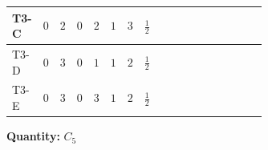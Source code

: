 \documentclass[8pt]{article}
\begin{document}
\begin{landscape}
\begin{longtable}{@{}llcccccc >{\raggedright\arraybackslash}p{0.21\linewidth} >{\raggedright\arraybackslash}p{0.21\linewidth} >{\raggedright\arraybackslash}p{0.21\linewidth}@{}}
\midrule
T3-C & $0$ & $2$ & $0$ & $2$ & $1$ & $3$ & $\frac{1}{2}$ & \scriptsize\adjustbox{max width=\linewidth}{$\begin{gathered} - 3 C_{5} g_{2}^{2}\end{gathered}$} & \scriptsize\adjustbox{max width=\linewidth}{$\begin{gathered} 2 C_{5} \lambda_1\end{gathered}$} & \scriptsize\adjustbox{max width=\linewidth}{$\begin{gathered} - C_{5} Y_e Y_e^\dagger\end{gathered}$} \\
\midrule
T3-D & $0$ & $3$ & $0$ & $1$ & $1$ & $2$ & $\frac{1}{2}$ & \scriptsize\adjustbox{max width=\linewidth}{$\begin{gathered} - 3 C_{5} g_{2}^{2}\end{gathered}$} & \scriptsize\adjustbox{max width=\linewidth}{$\begin{gathered} 2 C_{5} \lambda_1\end{gathered}$} & \scriptsize\adjustbox{max width=\linewidth}{$\begin{gathered} - C_{5} Y_e Y_e^\dagger\end{gathered}$} \\
\midrule
T3-E & $0$ & $3$ & $0$ & $3$ & $1$ & $2$ & $\frac{1}{2}$ & \scriptsize\adjustbox{max width=\linewidth}{$\begin{gathered} - 3 C_{5} g_{2}^{2}\end{gathered}$} & \scriptsize\adjustbox{max width=\linewidth}{$\begin{gathered} 2 C_{5} \lambda_1\end{gathered}$} & \scriptsize\adjustbox{max width=\linewidth}{$\begin{gathered} - C_{5} Y_e Y_e^\dagger\end{gathered}$} \\
\midrule
\bottomrule
\end{longtable}
\clearpage
\noindent\textbf{Quantity: }$C_5$\par\smallskip

\end{landscape}
\end{document}
